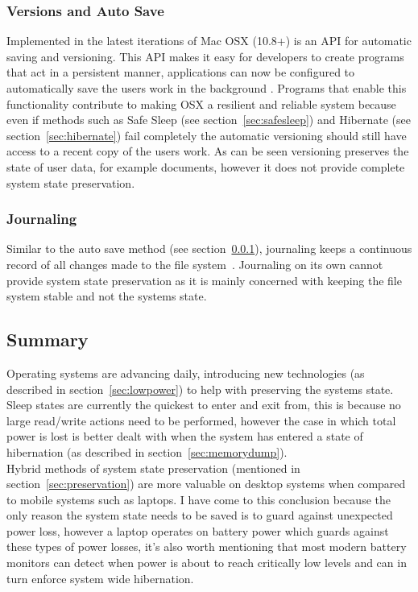 \documentclass[a4paper,12pt]{article}
\begin{document}
\subsubsection{Versions and Auto Save}\label{sec:versioning}
Implemented in the latest iterations of Mac OSX (10.8+) is an API for automatic saving and versioning. This API makes it easy for developers to create programs that act in a persistent manner, applications can now be configured to automatically save the users work in the background \citep{versioning}. 
Programs that enable this functionality contribute to making OSX a resilient and reliable system because even if methods such as Safe Sleep (see section~\ref{sec:safesleep}) and Hibernate (see section~\ref{sec:hibernate}) fail completely the automatic versioning should still have access to a recent copy of the users work. As can be seen versioning preserves the state of user data, for example documents, however it does not provide complete system state preservation.

\subsubsection{Journaling}
Similar to the auto save method (see section~\ref{sec:versioning}), journaling keeps a continuous record of all changes made to the file system~\citep{journaling}. Journaling on its own cannot provide system  state preservation as it is mainly concerned with keeping the file system stable and not the systems state.
\citep{journaling}
\subsection{Summary}
Operating systems are advancing daily, introducing new technologies (as described in section~\ref{sec:lowpower}) to help with preserving the systems state.
\\
Sleep states are currently the quickest to enter and exit from, this is because no large read/write actions need to be performed, however the case in which total power is lost is better dealt with when the system has entered a state of hibernation (as described in section~\ref{sec:memorydump}).
\\
Hybrid methods of system state preservation (mentioned in section~\ref{sec:preservation}) are more valuable on desktop systems when compared to mobile systems such as laptops. I have come to this conclusion because the only reason the system state needs to be saved is to guard against unexpected power loss, however a laptop operates on battery power which guards against these types of power losses, it's also worth mentioning that most modern battery monitors can detect when power is about to reach critically low levels and can in turn enforce system wide hibernation.
\newpage
\end{document}
